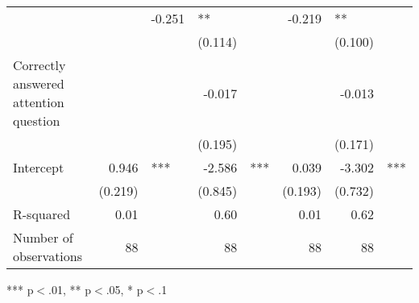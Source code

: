 \documentclass{article}
\begin{document}
\begin{table}[!h]
\begin{tabular}{llllllll}
  \multicolumn{1}{r}{} &
  \multicolumn{1}{l}{} &
  \multicolumn{1}{r}{-0.251} &
  \multicolumn{1}{l}{**} &
  \multicolumn{1}{r}{} &
  \multicolumn{1}{r}{-0.219} &
  \multicolumn{1}{l}{**} \\
\multicolumn{1}{l}{} &
  \multicolumn{1}{r}{} &
  \multicolumn{1}{l}{} &
  \multicolumn{1}{r}{(0.114)} &
  \multicolumn{1}{l}{} &
  \multicolumn{1}{r}{} &
  \multicolumn{1}{r}{(0.100)} &
  \multicolumn{1}{l}{} \\
\multicolumn{1}{l}{Correctly answered attention question} &
  \multicolumn{1}{r}{} &
  \multicolumn{1}{l}{} &
  \multicolumn{1}{r}{-0.017} &
  \multicolumn{1}{l}{} &
  \multicolumn{1}{r}{} &
  \multicolumn{1}{r}{-0.013} &
  \multicolumn{1}{l}{} \\
\multicolumn{1}{l}{} &
  \multicolumn{1}{r}{} &
  \multicolumn{1}{l}{} &
  \multicolumn{1}{r}{(0.195)} &
  \multicolumn{1}{l}{} &
  \multicolumn{1}{r}{} &
  \multicolumn{1}{r}{(0.171)} &
  \multicolumn{1}{l}{} \\
\multicolumn{1}{l}{Intercept} &
  \multicolumn{1}{r}{0.946} &
  \multicolumn{1}{l}{***} &
  \multicolumn{1}{r}{-2.586} &
  \multicolumn{1}{l}{***} &
  \multicolumn{1}{r}{0.039} &
  \multicolumn{1}{r}{-3.302} &
  \multicolumn{1}{l}{***} \\
\multicolumn{1}{l}{} &
  \multicolumn{1}{r}{(0.219)} &
  \multicolumn{1}{l}{} &
  \multicolumn{1}{r}{(0.845)} &
  \multicolumn{1}{l}{} &
  \multicolumn{1}{r}{(0.193)} &
  \multicolumn{1}{r}{(0.732)} &
  \multicolumn{1}{l}{} \\
\multicolumn{1}{l}{R-squared} &
  \multicolumn{1}{r}{0.01} &
  \multicolumn{1}{l}{} &
  \multicolumn{1}{r}{0.60} &
  \multicolumn{1}{l}{} &
  \multicolumn{1}{r}{0.01} &
  \multicolumn{1}{r}{0.62} &
  \multicolumn{1}{l}{} \\
\multicolumn{1}{l}{Number of observations} &
  \multicolumn{1}{r}{88} &
  \multicolumn{1}{l}{} &
  \multicolumn{1}{r}{88} &
  \multicolumn{1}{l}{} &
  \multicolumn{1}{r}{88} &
  \multicolumn{1}{r}{88} &
  \multicolumn{1}{l}{} \\
\cline{1-8}
\end{tabular}

\footnotesize{
*** p$<$.01, ** p$<$.05, * p$<$.1
}
\end{table}
\end{document}
